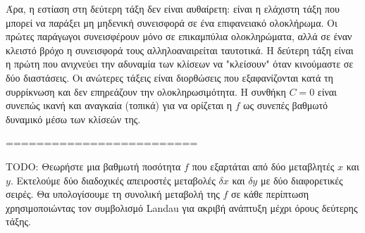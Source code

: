 \documentclass[11pt,a4paper,twoside,openright]{book}
\begin{document}
Άρα, η εστίαση στη δεύτερη τάξη δεν είναι αυθαίρετη: είναι η ελάχιστη τάξη που μπορεί να παράξει μη μηδενική συνεισφορά σε ένα επιφανειακό ολοκλήρωμα. Οι πρώτες παράγωγοι συνεισφέρουν μόνο σε επικαμπύλια ολοκληρώματα, αλλά σε έναν κλειστό βρόχο η συνεισφορά τους αλληλοαναιρείται ταυτοτικά. Η δεύτερη τάξη είναι η πρώτη που ανιχνεύει την αδυναμία των κλίσεων να "κλείσουν" όταν κινούμαστε σε δύο διαστάσεις. Οι ανώτερες τάξεις είναι διορθώσεις που εξαφανίζονται κατά τη συρρίκνωση και δεν επηρεάζουν την ολοκληρωσιμότητα. Η συνθήκη \(C = 0\) είναι συνεπώς ικανή και αναγκαία (τοπικά) για να ορίζεται η \(f\) ως συνεπές βαθμωτό δυναμικό μέσω των κλίσεών της.

=========================

TODO: Θεωρήστε μια βαθμωτή ποσότητα \(f\) που εξαρτάται από δύο μεταβλητές \(x\) και \(y\). Εκτελούμε δύο διαδοχικές απειροστές μεταβολές \(\delta x\) και \(\delta y\) με δύο διαφορετικές σειρές. Θα υπολογίσουμε τη συνολική μεταβολή της \(f\) σε κάθε περίπτωση χρησιμοποιώντας τον συμβολισμό Landau για ακριβή ανάπτυξη μέχρι όρους δεύτερης τάξης.
\end{document}
